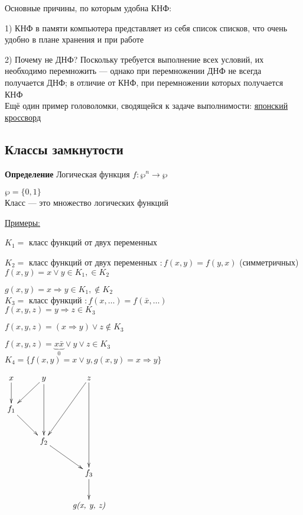 \documentclass[a4paper, 12pt] {article}
\begin{document}
 Основные причины, по которым удобна КНФ:
 
 1) КНФ в памяти компьютера представляет из себя список списков, что очень удобно в плане хранения и при работе
 
 2) Почему не ДНФ? Поскольку требуется выполнение всех условий, их необходимо перемножить --- однако при перемножении ДНФ не всегда получается ДНФ; в отличие от КНФ, при перемножении которых получается КНФ\\
 
 Ещё один пример головоломки, сводящейся к задаче выполнимости:  
 \href{https://ru.wikipedia.org/wiki/%D0%AF%D0%BF%D0%BE%D0%BD%D1%81%D0%BA%D0%B8%D0%B9_%D0%BA%D1%80%D0%BE%D1%81%D1%81%D0%B2%D0%BE%D1%80%D0%B4}{японский кроссворд}\\
 
 \subsection{Классы замкнутости}
 
 \textbf{Определение} Логическая функция $ f: \wp^{n} \rightarrow \wp$
 
 $ \wp = \{0, 1 \} $\\
 
 Класс --- это множество логических функций
 
\underline{ Примеры:}
 
$ K_{1}= $ класс функций от двух переменных
 
$ K_{2}= $ класс функций от двух переменных $ : f(x, y) = f(y, x) $ (симметричных)\\
 
 $ f(x, y) = x \vee y \in K_{1}, \in K_{2} $
 
 $ g(x, y) = x \Rightarrow y \in K_{1}, \notin K_{2} $\\
 
 $ K_{3}= $ класс функций $ : f(x, \dots) = f(\bar x, \dots) $\\
 
$  f(x, y, z) = y \Rightarrow z \in K_{3} $

$  f(x, y, z) = (x \Rightarrow y) \vee z \notin K_{3} $

$  f(x, y, z) = \underbrace{x \bar x}_0 \vee y \vee z \in K_{3} $\\

 $ K_{4}= \{ f(x, y) = x \vee y, g(x, y) = x \Rightarrow y \}$
 
 
 $ \begin{matrix}
 	\xymatrix{
 		x \ar@{->}[d] & y \ar@{->}[dl] \ar@{->}[dd] & z \ar@{->}[ddl] \ar@{->}[ddd] \\
 		f_{1} \ar@{->}[dr] \\
 		& f_{2} \ar@{->}[dr]\\
 		& & f_{3} \ar@{->}[d] \\
 		& & \text{\textit{g(x, y, z)}} \\
 	}
 \end{matrix} $\\
\end{document}
